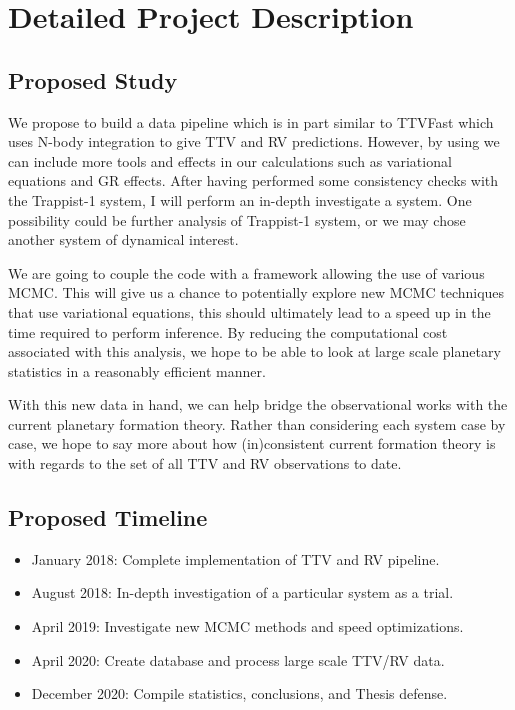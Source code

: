 \section{Detailed Project Description}
\subsection{Proposed Study}
We propose to build a data pipeline which is in part similar to TTVFast which uses N-body integration to give TTV and RV predictions. 
However, by using \reb we can include more tools and effects in our calculations such as variational equations and GR effects.
After having performed some consistency checks with the Trappist-1 system, I will perform an in-depth investigate a system.
One possibility could be further analysis of Trappist-1 system, or we may chose another system of dynamical interest.


We are going to couple the \reb code with a framework allowing the use of various MCMC.
This will give us a chance to potentially explore new MCMC techniques that use variational equations, this should ultimately lead to a speed up in the time required to perform inference.
By reducing the computational cost associated with this analysis, we hope to be able to look at large scale planetary statistics in a reasonably efficient manner.


With this new data in hand, we can help bridge the observational works with the current planetary formation theory.
Rather than considering each system case by case, we hope to say more about how (in)consistent current formation theory is with regards to the set of all TTV and RV observations to date.
\subsection{Proposed Timeline}
\begin{itemize}
	\item January 2018: Complete implementation of TTV and RV pipeline.
	\item August 2018: In-depth investigation of a particular system as a trial.
	\item April 2019: Investigate new MCMC methods and speed optimizations.
	\item April 2020: Create database and process large scale TTV/RV data.
	\item December 2020: Compile statistics, conclusions, and Thesis defense.
\end{itemize}

